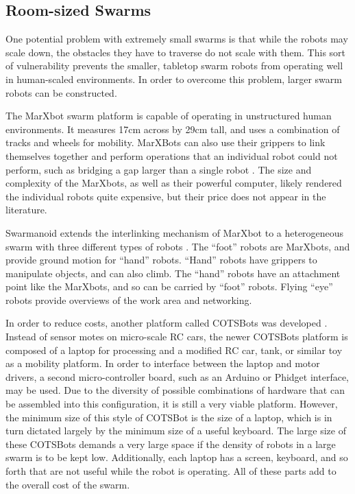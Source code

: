 \subsection{Room-sized Swarms} \label{section:Room_sized_Swarms}

One potential problem with extremely small swarms is that while the robots may scale down, the obstacles they have to traverse do not scale with them. 
This sort of vulnerability prevents the smaller, tabletop swarm robots from operating well in human-scaled environments. 
In order to overcome this problem, larger swarm robots can be constructed.
 
The MarXbot swarm platform is capable of operating in unstructured human environments. 
It measures 17cm across by 29cm tall, and uses a combination of tracks and wheels for mobility.
MarXBots can also use their grippers to link themselves together and perform operations that an individual robot could not perform, such as bridging a gap larger than a single robot \citep{bonani2010marxbot}. 
The size and complexity of the MarXbots, as well as their powerful computer, likely rendered the individual robots quite expensive, but their price does not appear in the literature. 

Swarmanoid extends the interlinking mechanism of MarXbot to a heterogeneous swarm with three different types of robots \citep{dorigo2013swarmanoid}.
The ``foot'' robots are MarXbots, and provide ground motion for ``hand'' robots. 
``Hand'' robots have grippers to manipulate objects, and can also climb.
The ``hand'' robots have an attachment point like the MarXbots, and so can be carried by ``foot'' robots. 
Flying ``eye'' robots provide overviews of the work area and networking.  

In order to reduce costs, another platform called COTSBots was developed \citep{soule2011cotsbots}.  
Instead of sensor motes on micro-scale RC cars, the newer COTSBots platform is composed of a laptop for processing and a modified RC car, tank, or similar toy as a mobility platform.
In order to interface between the laptop and motor drivers, a second micro-controller board, such as an Arduino or Phidget interface, may be used. 
Due to the diversity of possible combinations of hardware that can be assembled into this configuration, it is still a very viable platform. 
However, the minimum size of this style of COTSBot is the size of a laptop, which is in turn dictated largely by the minimum size of a useful keyboard. 
The large size of these COTSBots demands a very large space if the density of robots in a large swarm is to be kept low. 
Additionally, each laptop has a screen, keyboard, and so forth that are not useful while the robot is operating. 
All of these parts add to the overall cost of the swarm. 

